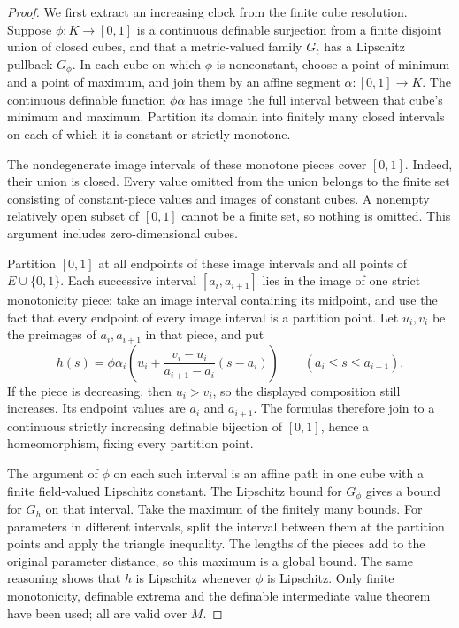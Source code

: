 \begin{proof}
We first extract an increasing clock from the finite cube resolution.
Suppose $\phi:K\to[0,1]$ is a continuous definable surjection from
a finite disjoint union of closed cubes, and that a metric-valued
family $G_t$ has a Lipschitz pullback $G_\phi$.  In each cube on
which $\phi$ is nonconstant, choose a point of minimum and a point
of maximum, and join them by an affine segment $\alpha:[0,1]\to K$.
The continuous definable function $\phi\alpha$ has image the full
interval between that cube's minimum and maximum.  Partition its
domain into finitely many closed intervals on each of which it is
constant or strictly monotone.

The nondegenerate image intervals of these monotone pieces cover
$[0,1]$.  Indeed, their union is closed.  Every value omitted from
the union belongs to the finite set consisting of constant-piece
values and images of constant cubes.  A nonempty relatively open
subset of $[0,1]$ cannot be a finite set, so nothing is omitted.
This argument includes zero-dimensional cubes.

Partition $[0,1]$ at all endpoints of these image intervals and all
points of $E\cup\{0,1\}$.  Each successive interval $[a_i,a_{i+1}]$
lies in the image of one strict monotonicity piece: take an image
interval containing its midpoint, and use the fact that every
endpoint of every image interval is a partition point.  Let
$u_i,v_i$ be the preimages of $a_i,a_{i+1}$ in that piece, and put
\[
 h(s)=\phi\alpha_i\left(
 u_i+\frac{v_i-u_i}{a_{i+1}-a_i}(s-a_i)\right)
 \qquad(a_i\le s\le a_{i+1}).
\]
If the piece is decreasing, then $u_i>v_i$, so the displayed
composition still increases.  Its endpoint values are $a_i$ and
$a_{i+1}$.  The formulas therefore join to a continuous strictly
increasing definable bijection of $[0,1]$, hence a homeomorphism,
fixing every partition point.

The argument of $\phi$ on each such interval is an affine path in
one cube with a finite field-valued Lipschitz constant.  The
Lipschitz bound for $G_\phi$ gives a bound for $G_h$ on that interval.
Take the maximum of the finitely many bounds.  For parameters in
different intervals, split the interval between them at the
partition points and apply the triangle inequality.  The lengths
of the pieces add to the original parameter distance, so this
maximum is a global bound.  The same reasoning shows that $h$ is
Lipschitz whenever $\phi$ is Lipschitz.  Only finite monotonicity,
definable extrema and the definable intermediate value theorem
have been used; all are valid over $M$.


\end{proof}
